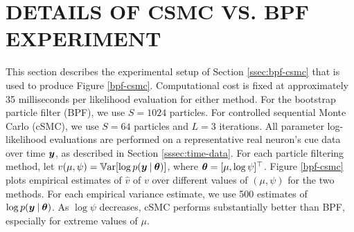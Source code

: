 \documentclass[twoside]{article}
\begin{document}
\section{DETAILS OF CSMC VS. BPF EXPERIMENT} \label{csmc-bpf-app}
This section describes the experimental setup of Section \ref{ssec:bpf-csmc} that is used to produce Figure \ref{bpf-csmc}.  Computational cost is fixed at approximately 35 milliseconds per likelihood evaluation for either method.  For the bootstrap particle filter (BPF), we use $S = 1024$ particles.  For controlled sequential Monte Carlo (cSMC), we use $S = 64$ particles and $L = 3$ iterations.  All parameter log-likelihood evaluations are performed on a representative real neuron's cue data over time $\boldsymbol{y}$, as described in Section \ref{sssec:time-data}.  For each particle filtering method, let $v(\mu, \psi) = \mathbb{V}\text{ar}[\log p(\boldsymbol{y} \:\vert\: \boldsymbol{\theta})]$, where $\boldsymbol{\theta} = [\mu, \log \psi]^\top$.  Figure \ref{bpf-csmc} plots empirical estimates of $\hat{v}$ of $v$ over different values of $(\mu, \psi)$ for the two methods.  For each empirical variance estimate, we use 500 estimates of $\log p(\boldsymbol{y} \:\vert\: \boldsymbol{\theta})$.  As $\log \psi$ decreases, cSMC performs substantially better than BPF, especially for extreme values of $\mu$.  
\end{document}

